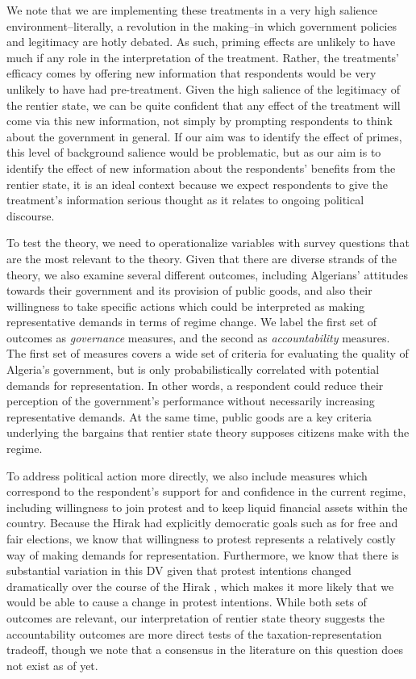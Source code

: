 \documentclass[12pt, letterpaper]{article}
\begin{document}
We note that we are implementing these treatments in a very high salience environment--literally, a revolution in the making--in which government policies and legitimacy are hotly debated. As such, priming effects are unlikely to have much if any role in the interpretation of the treatment. Rather, the treatments' efficacy comes by offering new information that respondents would be very unlikely to have had pre-treatment. Given the high salience of the legitimacy of the rentier state, we can be quite confident that any effect of the treatment will come via this new information, not simply by prompting respondents to think about the government in general. If our aim was to identify the effect of primes, this level of background salience would be problematic, but as our aim is to identify the effect of new information about the respondents' benefits from the rentier state, it is an ideal context because we expect respondents to give the treatment's information serious thought as it relates to ongoing political discourse. 

To test the theory, we need to operationalize variables with survey questions that are the most relevant to the theory. Given that there are diverse strands of the theory, we also examine several different outcomes, including Algerians' attitudes towards their government and its provision of public goods, and also their willingness to take specific actions which could be interpreted as making representative demands in terms of regime change. We label the first set of outcomes as \emph{governance} measures, and the second as \emph{accountability} measures. The first set of measures covers a wide set of criteria for evaluating the quality of Algeria's government, but is only probabilistically correlated with potential demands for representation. In other words, a respondent could reduce their perception of the government's performance without necessarily increasing representative demands. At the same time, public goods are a key criteria underlying the bargains that rentier state theory supposes citizens make with the regime.

To address political action more directly, we also include measures which correspond to the respondent's support for and confidence in the current regime, including willingness to join protest and to keep liquid financial assets within the country. Because the Hirak had explicitly democratic goals such as for free and fair elections, we know that willingness to protest represents a relatively costly way of making demands for representation. Furthermore, we know that there is substantial variation in this DV given that protest intentions changed dramatically over the course of the Hirak \parencite{kilavuz_ghosts_2023}, which makes it more likely that we would be able to cause a change in protest intentions. While both sets of outcomes are relevant, our interpretation of rentier state theory suggests the accountability outcomes are more direct tests of the taxation-representation tradeoff, though we note that a consensus in the literature on this question does not exist as of yet.
\end{document}
